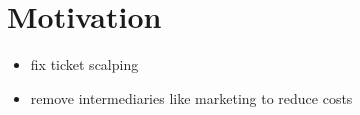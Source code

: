 \section{Motivation}

{\color{red}
\begin{itemize}
    \item fix ticket scalping
    \item remove intermediaries like marketing to reduce costs
\end{itemize}
}